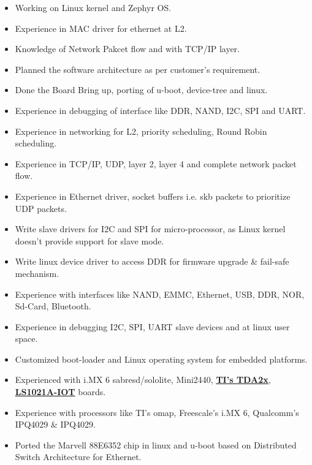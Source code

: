 \footnotesize {
   \begin{itemize}[label={\textendash}]\itemsep\isep
      \item \noindent Working on Linux kernel and Zephyr OS.
      \item \noindent Experience in MAC driver for ethernet at L2.
      \item \noindent Knowledge of Network Pakcet flow and with TCP/IP layer.
      \item \noindent Planned the software architecture as per customer's requirement.
      \item \noindent Done the Board Bring up, porting of u-boot, device-tree and linux.
      \item \noindent Experience in debugging of interface like DDR, NAND, I2C, SPI and UART.
      \item \noindent Experience in networking for L2, priority scheduling, Round Robin scheduling.
      \item \noindent Experience in TCP/IP, UDP, layer 2, layer 4 and complete network packet flow.
      \item \noindent Experience in Ethernet driver, socket buffers i.e. skb packets to prioritize UDP packets.
      \item \noindent Write slave drivers for I2C and SPI for micro-processor, as Linux kernel doesn’t provide support for slave mode.
      \item \noindent Write linux device driver to access DDR for firmware upgrade \& fail-safe mechanism.
      \item \noindent Experience with interfaces like NAND, EMMC, Ethernet, USB, DDR, NOR, Sd-Card, Bluetooth.
      \item \noindent Experience in debugging I2C, SPI, UART slave devices and at linux user space.
      \item \noindent Customized boot-loader and Linux operating system for embedded platforms.
      \item \noindent Experienced with i.MX 6 sabresd/sololite, Mini2440, 
      \href{http://www.radiumboards.com/TI\_TDA2x\_Based\_xCAM\_Platform.php}{\textbf{\underline{TI's TDA2x}}},
      \href{http://www.nxp.com/products/reference-designs/qoriq-ls1021a-iot-gateway-reference-design:LS1021A-IoT}{\textbf{\underline{LS1021A-IOT}}} boards.
         \item \noindent Experience with processors like TI's omap, Freescale's i.MX 6, Qualcomm's IPQ4029 \& IPQ4029.
         \item \noindent Ported the Marvell 88E6352 chip in linux and u-boot based on Distributed Switch Architecture for Ethernet.
         \end{itemize}
\vspace{3pt}
}

